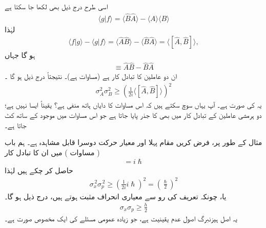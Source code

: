 اسی طرح درج ذیل بھی لکھا جا سکتا ہے 
\begin{align*}
\langle g|f \rangle = \langle \hat{B}\hat{A} \rangle - \langle A \rangle \langle B \rangle 
\end{align*}
لہٰذا 
\begin{align*}
\langle f|g \rangle - \langle g|f \rangle = \langle \hat{A}\hat{B} \rangle -\langle \hat{B}\hat{A} \rangle = \langle [ \hat{A} , \hat{B}] \rangle ,
\end{align*}
ہو گا  جہاں
\begin{align*}
[\hat{A} , \hat{B}] \equiv \hat{A} \hat{B} - \hat{B}\hat{A}
\end{align*}
 ان دو عاملین کا  تبادل کار  ہے   (مساوات  ہے)۔ نتیجتاً  درج ذیل ہو گا ۔
\begin{align}\label{مساوات_قواعد_عمومی_اصول_عدم_یقینیت_الف_بے}
\sigma_{A}^{2} \sigma_{B}^{2} \geq \left(\frac{1}{2i} \langle [\hat{A} , \hat{B}] \rangle \right)^{2}
\end{align}
یہ     کی صورت ہے۔ آپ یہاں سوچ سکتے ہیں کہ اس  مساوات کا دایاں ہاتھ منفی ہے؟ یقیناً ایسا نہیں ہے؛  دو ہرمشی عاملین کے تبادل کار میں بھی   کا جذر  پایا جاتا ہے جو اس  مساوات میں موجود  کے ساتھ کٹ جاتا ہے۔ 

مثال کے طور پر، فرض کریں   مقام   پہلا   اور   معیار حرکت  دوسرا قابل مشاہدہ   ہے۔  ہم باب    ( مساوات )    میں ان کا تبادل کار
\begin{align*}
[ \hat{x}, \hat{p} ] = i \hslash
\end{align*}
حاصل کر چکے ہیں لہٰذا
\begin{align*}
\sigma_{x}^{\,2} \sigma_{p}^{\,2} \geq \left( \frac{1}{2i} i \hslash \right)^{2} = \left( \frac{\hslash}{2} \right)^{2}
\end{align*}
یا،   چونکہ تعریف کی رو سے معیاری انحراف مثبت ہوتے ہیں،   درج ذیل ہو گا۔
\begin{align}
\sigma_{x} \sigma_{p} \geq \frac{h}{2}
\end{align}
یہ اصل  ہیزنبرگ   اصول  عدم یقینیت  ہے،  جو  زیادہ عمومی مسئلے کی ایک مخصوص صورت ہے۔

